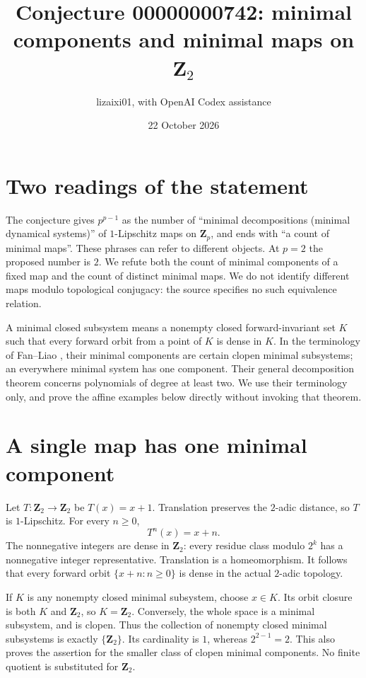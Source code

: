 \documentclass[11pt]{article}
\title{Conjecture 00000000742: minimal components and minimal maps on $\mathbf Z_2$}
\author{lizaixi01, with OpenAI Codex assistance}
\date{22 October 2026}
\begin{document}
\maketitle
\section{Two readings of the statement}
The conjecture gives $p^{p-1}$ as the number of ``minimal decompositions
(minimal dynamical systems)'' of $1$-Lipschitz maps on $\mathbf Z_p$,
and ends with ``a count of minimal maps''. These phrases can refer to
different objects. At $p=2$ the proposed number is $2$. We refute both
the count of minimal components of a fixed map and the count of distinct
minimal maps. We do not identify different maps modulo topological
conjugacy: the source specifies no such equivalence relation.

A minimal closed subsystem means a nonempty closed forward-invariant
set $K$ such that every forward orbit from a point of $K$ is dense in
$K$. In the terminology of Fan--Liao \cite{FL}, their minimal components
are certain clopen minimal subsystems; an everywhere minimal system has
one component. Their general decomposition theorem concerns polynomials
of degree at least two. We use their terminology only, and prove the
affine examples below directly without invoking that theorem.

\section{A single map has one minimal component}
Let $T:\mathbf Z_2\to\mathbf Z_2$ be $T(x)=x+1$. Translation preserves
the $2$-adic distance, so $T$ is $1$-Lipschitz. For every $n\geq0$,
\[
 T^n(x)=x+n.
\]
The nonnegative integers are dense in $\mathbf Z_2$: every residue class
modulo $2^k$ has a nonnegative integer representative. Translation is a
homeomorphism. It follows that every forward orbit $\{x+n:n\geq0\}$ is
dense in the actual $2$-adic topology.

If $K$ is any nonempty closed minimal subsystem, choose $x\in K$.
Its orbit closure is both $K$ and $\mathbf Z_2$, so $K=\mathbf Z_2$.
Conversely, the whole space is a minimal subsystem, and is clopen.
Thus the collection of nonempty closed minimal subsystems is exactly
$\{\mathbf Z_2\}$. Its cardinality is $1$, whereas $2^{2-1}=2$.
This also proves the assertion for the smaller class of clopen minimal
components. No finite quotient is substituted for $\mathbf Z_2$.
\end{document}
